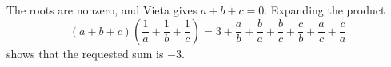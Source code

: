 The roots are nonzero, and Vieta gives $a+b+c=0$. Expanding the product
\[(a+b+c)\left(\dfrac{1}{a}+\dfrac{1}{b}+\dfrac{1}{c}\right)=3+\dfrac{a}{b}+\dfrac{b}{a}+\dfrac{b}{c}+\dfrac{c}{b}+\dfrac{a}{c}+\dfrac{c}{a}\]
shows that the requested sum is $\boxed{-3}$.
